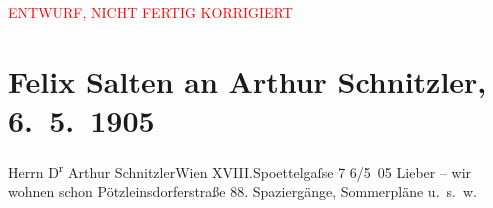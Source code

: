 
\begin{center}
            \textcolor{red}{ENTWURF, NICHT FERTIG KORRIGIERT}
                      \end{center}
            
         
         \renewcommand{\erwaehntePersonen}{Personen: Max Reinhardt, Ottilie Salten, Olga Schnitzler}
         \renewcommand{\erwaehnteInstitutionen}{Institutionen: Kleines Theater, Neues Theater}
         \renewcommand{\erwaehnteOrte}{Orte: Edmund-Weiß-Gasse, Florenz, I., Innere Stadt, Mariazell, Pötzleinsdorferstraße, Theater an der Wien, Wien, XVIII., Währing}
         \renewcommand{\erwaehnteWerke}{Werke: Ein Sommernachtstraum. Komödie in fünf Aufzügen}
               \section[Felix Salten an Arthur Schnitzler, 6. 5. 1905]{ Felix Salten an Arthur Schnitzler, 6. 5. 1905}\nopagebreak{}\rehead{ }\begin{ledgroupsized}[t]{13cm}\normalsize\beginnumbering \toendnotes[C]{\smallbreak\pagebreak[2]} 
\toendnotes[C]{\smallbreak}\pstart{}{\pb}Herrn D\textsuperscript{r} Arthur Schnitzler\pend{}\pstart{}Wien XVIII.\pend{}\pstart{}Spoettelgaſse 7\pend{}{\bigskip}\pstart
           \raggedleft{}{\pb}6/5 05\pend
           \pstart
           Lieber – wir wohnen schon Pötzleinsdorferstraße 88. Spaziergänge, Sommerpläne u. s. w.

\end{ledgroupsized}
